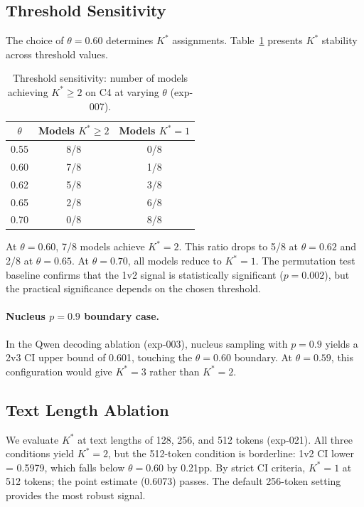 \documentclass[11pt,a4paper]{article}
\begin{document}
\subsection{Threshold Sensitivity}
\label{sec:theta}

The choice of $\theta = 0.60$ determines $K^*$ assignments. Table~\ref{tab:theta} presents $K^*$ stability across threshold values.

\begin{table}[t]
\centering
\caption{Threshold sensitivity: number of models achieving $K^* \geq 2$ on C4 at varying $\theta$ (exp-007).}
\label{tab:theta}
\small
\begin{tabular}{ccc}
\toprule
$\theta$ & Models $K^* \geq 2$ & Models $K^* = 1$ \\
\midrule
0.55 & 8/8 & 0/8 \\
0.60 & 7/8 & 1/8 \\
0.62 & 5/8 & 3/8 \\
0.65 & 2/8 & 6/8 \\
0.70 & 0/8 & 8/8 \\
\bottomrule
\end{tabular}
\end{table}

At $\theta = 0.60$, 7/8 models achieve $K^* = 2$. This ratio drops to 5/8 at $\theta = 0.62$ and 2/8 at $\theta = 0.65$. At $\theta = 0.70$, all models reduce to $K^* = 1$. The permutation test baseline confirms that the 1v2 signal is statistically significant ($p = 0.002$), but the practical significance depends on the chosen threshold.

\paragraph{Nucleus $p=0.9$ boundary case.}
In the Qwen decoding ablation (exp-003), nucleus sampling with $p=0.9$ yields a 2v3 CI upper bound of 0.601, touching the $\theta = 0.60$ boundary. At $\theta = 0.59$, this configuration would give $K^* = 3$ rather than $K^* = 2$.

\subsection{Text Length Ablation}

We evaluate $K^*$ at text lengths of 128, 256, and 512 tokens (exp-021). All three conditions yield $K^* = 2$, but the 512-token condition is borderline: 1v2 CI lower = 0.5979, which falls below $\theta = 0.60$ by 0.21pp. By strict CI criteria, $K^* = 1$ at 512 tokens; the point estimate (0.6073) passes. The default 256-token setting provides the most robust signal.
\end{document}
